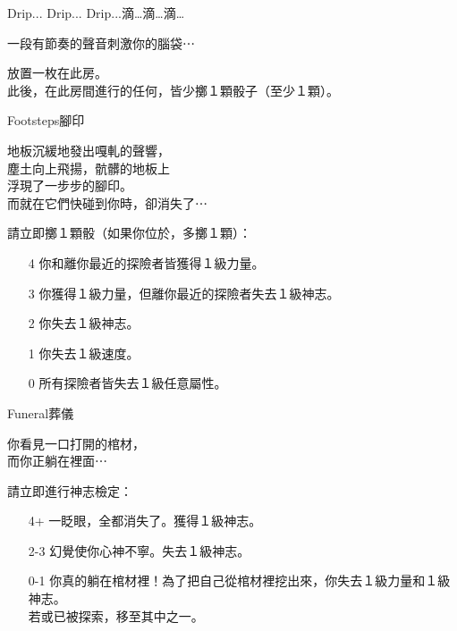 %
\begin{EventCard}{Drip... Drip... Drip...}{滴…滴…滴…}

  \begin{CardStory}
    一段有節奏的聲音刺激你的腦袋⋯
  \end{CardStory}

  放置一枚在此房。\\[0.5em]
  此後，在此房間進行的任何，皆少擲１顆骰子（至少１顆）。\\[0.5em]

\end{EventCard}%
%
\begin{EventCard}{Footsteps}{腳印}

  \begin{CardStory}
    地板沉緩地發出嘎軋的聲響，\\
    塵土向上飛揚，骯髒的地板上\\
    浮現了一步步的腳印。\\
    而就在它們快碰到你時，卻消失了⋯
  \end{CardStory}

  請立即擲１顆骰（如果你位於，多擲１顆）：
  \begin{itemize}
    \item[4] 你和離你最近的探險者皆獲得１級力量。
    \item[3] 你獲得１級力量，但離你最近的探險者失去１級神志。
    \item[2] 你失去１級神志。
    \item[1] 你失去１級速度。
    \item[0] 所有探險者皆失去１級任意屬性。
  \end{itemize}

\end{EventCard}%
%
\begin{EventCard}{Funeral}{葬儀}

  \begin{CardStory}
    你看見一口打開的棺材，\\
    而你正躺在裡面⋯
  \end{CardStory}

  請立即進行神志檢定：
  \begin{itemize}
    \item[4+] 一眨眼，全都消失了。獲得１級神志。
    \item[2-3] 幻覺使你心神不寧。失去１級神志。
    \item[0-1] 你真的躺在棺材裡！為了把自己從棺材裡挖出來，你失去１級力量和１級神志。\\
               若或已被探索，移至其中之一。
  \end{itemize}

\end{EventCard}%

